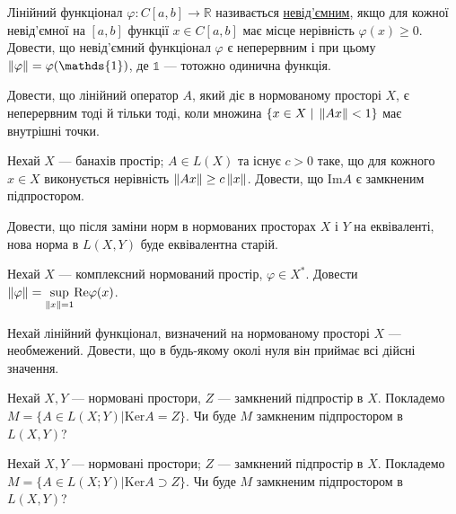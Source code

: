 
\begin{exercise}
    Лінійний функціонал $\varphi: C[a, b] \rightarrow \mathbb{R}$ називається \underline{невід'ємним},
    якщо для кожної невід'ємної на $[a ,b]$ функції $x \in C[a, b]$ має місце нерівність 
    $\varphi(x) \geq 0$. Довести, що невід'ємний функціонал $\varphi$ є неперервним і при цьому
    $\norm{\varphi} = \varphi(\mathds{1})$, де $\mathds{1}$ --- тотожно одинична функція.
\end{exercise}

\begin{exercise}
    Довести, що лінійний оператор $A$, який діє в нормованому просторі $X$, є неперервним тоді
    й тільки тоді, коли множина $\{x \in X \;|\; \left\lVert Ax\right\rVert < 1\}$ має внутрішні точки.
\end{exercise}

\begin{exercise}
    Нехай $X$ --- банахів простір; $A \in L(X)$ та існує $c > 0$ таке, що для кожного $x \in X$
    виконується нерівність $\left\lVert Ax\right\rVert \geq c \left\lVert x\right\rVert$. Довести, що $\mathrm{Im} A$ є замкненим підпростором.
\end{exercise}

\begin{exercise}
    Довести, що після заміни норм в нормованих просторах $X$ і $Y$ на еквіваленті,
    нова норма в $L\left( X, Y\right)$ буде еквівалентна старій.
\end{exercise}

\begin{exercise}
    Нехай $X$ --- комплексний нормований простір, $\varphi \in X^*$. Довести $\left\lVert\varphi\right\rVert = \underset{\left\lVert x\right\rVert=1}{\sup}\mathrm{Re}\varphi(x)$.
\end{exercise}

\begin{exercise}
    Нехай лінійний функціонал, визначений на нормованому просторі  $X$ --- необмежений.
    Довести, що в будь-якому околі нуля він приймає всі дійсні значення.
\end{exercise}

\begin{exercise}
    Нехай $X,Y$ --- нормовані простори, $Z$ --- замкнений підпростір в $X$. Покладемо 
    $M = \{A \in L(X;Y) | \mathrm{Ker} A = Z\}$. Чи буде $M$ замкненим підпростором в $L\left( X, Y\right)$?
\end{exercise}

\begin{exercise}
    Нехай $X,Y$ --- нормовані простори; $Z$ --- замкнений підпростір в $X$. Покладемо 
    $M = \{A \in L(X;Y) | \mathrm{Ker} A \supset Z\}$. Чи буде $M$ замкненим підпростором в $L\left( X, Y\right)$?
\end{exercise}


